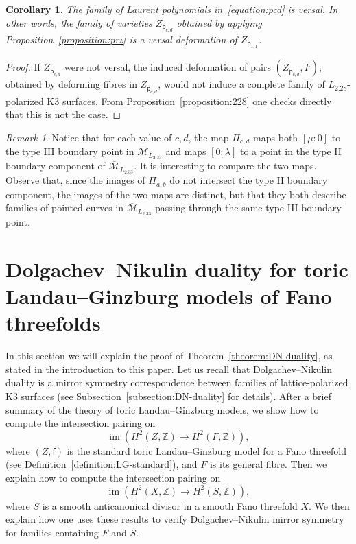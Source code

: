 \documentclass[10pt]{amsart}
\numberwithin{equation}{section}
\theoremstyle{plain}
\newtheorem{corollary}[theorem]{Corollary}
\theoremstyle{definition}
\theoremstyle{remark}
\newtheorem{remark}[theorem]{Remark}
\DeclareMathOperator{\im}{im}
\begin{document}
\begin{corollary}
  The family of Laurent polynomials in~\eqref{equation:pcd} is versal. In other words, the family of varieties \(Z_{\mathsf{p}_{c,d}}\) obtained by applying Proposition~\ref{proposition:prz} is a versal deformation of \(Z_{\mathsf{p}_{1,1}}\).
\end{corollary}

\begin{proof}
  If \(Z_{\mathsf{p}_{c,d}}\) were not versal, the induced deformation of pairs \((Z_{\mathsf{p}_{c,d}},F)\), obtained by deforming fibres in \(Z_{\mathsf{p}_{c,d}}\), would not induce a complete family of \(L_{2.28}\)-polarized K3 surfaces. From Proposition~\ref{proposition:228} one checks directly that this is not the case.
\end{proof}

\begin{remark}
  Notice that for each value of \(c,d\), the map \(\Pi_{c,d}\) maps both \([\mu:0]\) to the type III boundary point in \(\overline{\mathcal{M}}_{L_{2.33}}\) and maps \([0:\lambda]\) to a point in the type II boundary component of \(\overline{\mathcal{M}}_{L_{2.33}}\). It is interesting to compare the two maps. Observe that, since the images of \(\Pi_{a,b}\) do not intersect the type II boundary component, the images of the two maps are distinct, but that they both describe families of pointed curves in \(\overline{\mathcal{M}}_{L_{2.33}}\) passing through the same type III boundary point.
\end{remark}


\section{Dolgachev--Nikulin duality for toric Landau--Ginzburg models of Fano threefolds}\label{section:DN-duality}

In this section we will explain the proof of Theorem~\ref{theorem:DN-duality}, as stated in the introduction to this paper. Let us recall that Dolgachev--Nikulin duality is a mirror symmetry correspondence between families of lattice-polarized K3 surfaces (see Subsection~\ref{subsection:DN-duality} for details). After a brief summary of the theory of toric Landau--Ginzburg models, we show how to compute the intersection pairing on
\[
  \im(H^2(Z,\mathbb{Z}) \rightarrow H^2(F,\mathbb{Z})),
\]
where \((Z, \mathsf{f})\) is the standard toric Landau--Ginzburg model for a Fano threefold (see Definition~\ref{definition:LG-standard}), and \(F\) is its general fibre. Then we explain how to compute the intersection pairing on
\[
  \im(H^2(X,\mathbb{Z})\rightarrow H^2(S,\mathbb{Z})),
\]
where \(S\) is a smooth anticanonical divisor in a smooth Fano threefold \(X\). We then explain how one uses these results to verify Dolgachev--Nikulin mirror symmetry for families containing \(F\) and \(S\).
\end{document}
